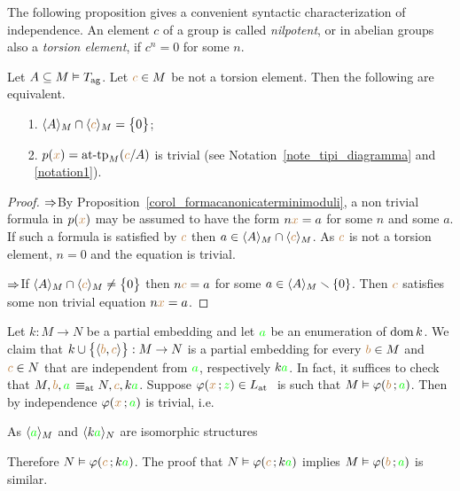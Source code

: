 \documentclass[creche.tex]{subfiles}
\begin{document}
The following proposition gives a convenient syntactic characterization of independence. An element $c$ of a group is called  \emph{nilpotent}, or in abelian groups also a \emph{torsion element}, if $c^n=0$ for some $n$.


\begin{proposition}
Let $A\subseteq M\models T_{\rm ag}$. Let ${\mr c}\in M$ be not a torsion element. Then the following are equivalent.
\begin{itemize}
 \item[1.] $\<A\>_M\cap\<{\mr c}\>_M=\big\{0\big\}$;
 \item[2.] $p({\mr x})=\attp_M({\mr c}/A)$ is trivial (see Notation~\ref{note_tipi_diagramma} and ~\ref{notation1}).
\end{itemize}
\end{proposition}
\begin{proof}
$\IMP$\quad By Proposition~\ref{corol_formacanonicaterminimoduli}, a non trivial formula in $p({\mr x})$ may be assumed to have the form $n{\mr x}=a$ for some $n$ and some $a$. If such a formula is satisfied by ${\mr c}$ then $a\in\<A\>_M\cap\<{\mr c}\>_M$. As ${\mr c}$ is not a torsion element, $n=0$ and the equation is trivial.

$\IMP$\quad If $\<A\>_M\cap\<{\mr c}\>_M\neq\big\{0\big\}$ then $n{\mr c}=a$ for some $a\in\<A\>_M\sm\{0\}$. Then ${\mr c}$ satisfies some non trivial equation $n{\mr x}=a$.
\end{proof}


\begin{remark}\label{oss_liberi_qf}
Let $k:M\to N$ be a partial embedding and let ${\gr a}$ be an enumeration of $\dom k$. We claim that  $k\cup\big\{\<{\mr b},{\mr c}\>\big\}:M\to N$ is a partial embedding for every ${\mr b}\in M$ and ${\mr c}\in N$ that are independent from ${\gr a}$, respectively $k{\gr a}$. In fact, it suffices to check that $M,{\mr b},{\gr a}\,\equiv_{\rm at}N, {\mr c},k{\gr a}$. Suppose $\phi({\mr x}\,;{\gr z})\in\atL$ \ is such that $M\models\phi({\mr b}\,;{\gr a})$. Then by independence $\phi({\mr x}\,;{\gr a})$ is trivial, i.e.


As $\<{\gr a}\>_M$ and  $\<k{\gr a}\>_N$ are isomorphic structures 


Therefore $N\models\phi({\mr c}\,;k{\gr a})$. The proof that $N\models\phi({\mr c}\,;k{\gr a})$ implies $M\models\phi({\mr b}\,;{\gr a})$ is similar.\QED 
\end{remark}
\end{document}
